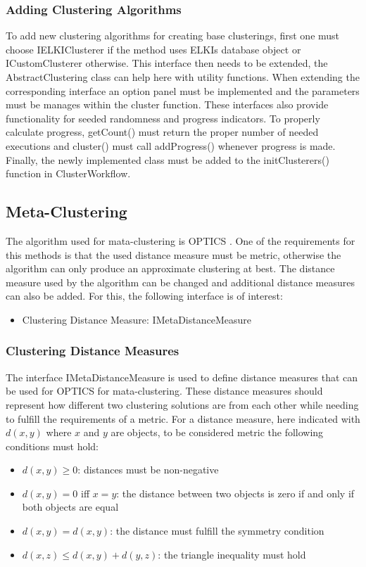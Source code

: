 \documentclass[
	a4paper,
	english,
	twoside,
	openright,               
	11pt                            
	]{report}
\begin{document}
\subsubsection*{Adding Clustering Algorithms}
To add new clustering algorithms for creating base clusterings, first one must choose IELKIClusterer if the method uses ELKIs database object or ICustomClusterer otherwise. This interface then needs to be extended, the AbstractClustering class can help here with utility functions. When extending the corresponding interface an option panel must be implemented and the parameters must be manages within the cluster function. These interfaces also provide functionality for seeded randomness and progress indicators. To properly calculate progress, getCount() must return the proper number of needed executions and cluster() must call addProgress() whenever progress is made. Finally, the newly implemented class must be added to the initClusterers() function in ClusterWorkflow.


\subsection{Meta-Clustering}
The algorithm used for mata-clustering is OPTICS \cite{10.1145/304181.304187}. One of the requirements for this methods is that the used distance measure must be metric, otherwise the algorithm can only produce an approximate clustering at best. The distance measure used by the algorithm can be changed and additional distance measures can also be added. For this, the following interface is of interest:

\begin{itemize}
  \item Clustering Distance Measure: IMetaDistanceMeasure
\end{itemize}
\subsubsection{Clustering Distance Measures}
The interface IMetaDistanceMeasure is used to define distance measures that can be used for OPTICS for mata-clustering. These distance measures should represent how different two clustering solutions are from each other while needing to fulfill the requirements of a metric. For a distance measure, here indicated with $d(x,y)$ where $x$ and $y$ are objects, to be considered metric the following conditions must hold:
\begin{itemize}
  \item $d(x,y)\geq0$: distances must be non-negative
  \item $d(x,y)=0$ iff $x=y$: the distance between two objects is zero if and only if both objects are equal
  \item $d(x,y)=d(x,y)$: the distance must fulfill the symmetry condition
  \item $d(x,z)\leq d(x,y)+d(y,z)$: the triangle inequality must hold
\end{itemize}
\end{document}
